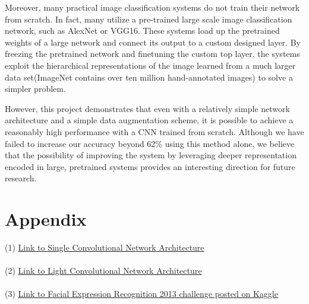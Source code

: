 \documentclass[11pt]{article}
\begin{document}
	Moreover, many practical image classification systems do not train their network from scratch. In fact, many utilize a pre-trained large scale image classification network, such as AlexNet\cite{NIPS2012_4824} or VGG16\cite{1409.1556}. These systems load up the pretrained weights of a large network and connect its output to a custom designed layer. By freezing the pretrained network and finetuning the custom top layer, the systems exploit the hierarchical representations of the image learned from a much larger data set(ImageNet\cite{imagenet_cvpr09} contains over ten million hand-annotated images) to solve a simpler problem.  
	
	However, this project demonstrates that even with a relatively simple network architecture and a simple data augmentation scheme, it is possible to achieve a reasonably high performance with a CNN trained from scratch. Although we have failed to increase our accuracy beyond 62\% using this method alone, we believe that the possibility of improving the system by leveraging deeper representation encoded in large, pretrained systems provides an interesting direction for future research.
	
	\section*{Appendix}
	(1) \href{https://github.swarthmore.edu/cs63-s17/lab10-dmin1-jhan2/blob/master/paper/figures/conv2_model.png}{Link to Single Convolutional Network Architecture}\\
	\noindent\\
	(2) \href{https://github.swarthmore.edu/cs63-s17/lab10-dmin1-jhan2/blob/master/paper/figures/light_conv_model.png}{Link to Light Convolutional Network Architecture}\\
	\noindent\\
	(3) \href{https://www.kaggle.com/c/challenges-in-representation-learning-facial-expression-recognition-challenge/data}{Link to Facial Expression Recognition 2013 challenge posted on Kaggle}
	
	
	
	
\end{document}
